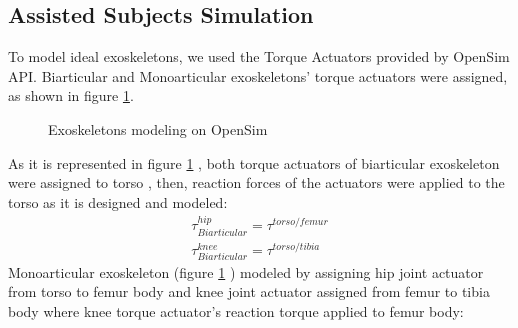 \documentclass[10pt,letterpaper]{article}
\begin{document}
\subsection*{Assisted Subjects Simulation}
To model ideal exoskeletons, we used the Torque Actuators provided by OpenSim API\cite{103}. Biarticular and Monoarticular exoskeletons' torque actuators were assigned, as shown in figure \ref{Fig_Exos_Model_Opensim}.
\begin{figure}[h!]
	\centering
	\hfil
	\caption{Exoskeletons modeling on OpenSim}
	\label{Fig_Exos_Model_Opensim}
\end{figure}
As it is represented in figure \ref{Fig_Exos_Model_Opensim} , both torque actuators of biarticular exoskeleton were assigned to torso , then, reaction forces of the actuators were applied to the torso as it is designed and modeled:
\begin{align}\label{Eqn_Biarticular_Torque_Act}
\tau^{hip}_{Biarticular} = \tau^{torso/femur}\\
\tau^{knee}_{Biarticular} = \tau^{torso/tibia}
\end{align}
Monoarticular exoskeleton (figure \ref{Fig_Exos_Model_Opensim} ) modeled by assigning hip joint actuator from torso to femur body and knee joint actuator assigned from femur to tibia body where knee torque actuator's reaction torque applied to femur body:
\end{document}
